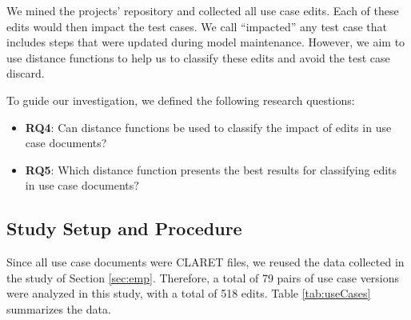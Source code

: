 
We mined the projects' repository and collected all use case edits. Each of these edits would then impact the test cases. We call ``impacted'' any test case that includes steps that were updated during model maintenance. However, we aim to use distance functions to help us to classify these edits and avoid the test case discard.

To guide our investigation, we defined the following research questions:
\begin{itemize}
\item \textbf{RQ4}: Can distance functions be used to classify the impact of edits in use case documents?  
\item \textbf{RQ5}: Which distance function presents the best results for classifying edits in use case documents?
\end{itemize}

\subsection{Study Setup and Procedure} \label{sec:procedure}
Since all use case documents were CLARET files, we reused the data collected in the study of Section \ref{sec:emp}. Therefore, a total of 79 pairs of use case versions were analyzed in this study, with a total of 518 edits. Table \ref{tab:useCases} summarizes the data.



